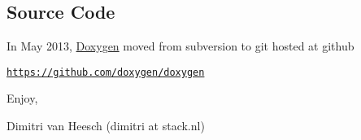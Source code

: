 \subsection*{Source Code }

In May 2013, \hyperlink{class_doxygen}{Doxygen} moved from subversion to git hosted at github
\begin{DoxyItemize}
\item \href{https://github.com/doxygen/doxygen}{\tt https\-://github.\-com/doxygen/doxygen}
\end{DoxyItemize}

Enjoy,

Dimitri van Heesch (dimitri at stack.\-nl) 